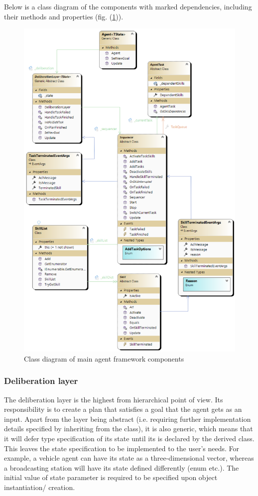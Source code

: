 \documentclass[main.tex]{subfiles}
\begin{document}
Below is a class diagram of the components with marked dependencies, including their methods and 
properties (fig. (\ref{mas-its-components})).


\begin{figure}[htbp]
    \centering
    \includegraphics[width=.9\textwidth]{MAS-ITS-Components.png}
    \caption{Class diagram of main agent framework components}
    \label{mas-its-components}
\end{figure}

\subsubsection{Deliberation layer}

The deliberation layer is the highest from hierarchical point of view. Its responsibility is to 
create a plan that satisfies a goal that the agent gets as an input. Apart from the layer 
being abstract (i.e. requiring further implementation details specified by inheriting from the 
class), it is also generic, which means that it will defer type specification of its state until 
its is declared by the derived class. This leaves the state specification to be implemented 
to the user's needs. For example, a vehicle agent can have its state as a three-dimensional
vector, whereas a broadcasting station will have its state defined differently (enum etc.).
The initial value of state parameter is required to be specified upon object instantiation/
creation.
\end{document}
